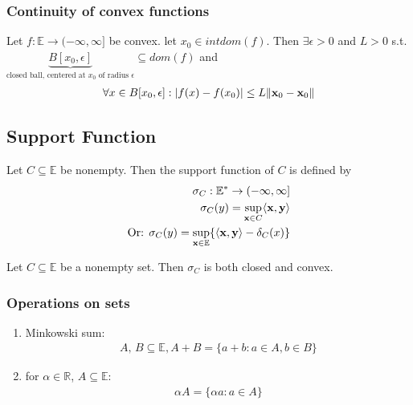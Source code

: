 \documentclass[11pt]{article}
\begin{document}
\subsubsection{Continuity of convex functions}
\begin{theorem}
    Let $f: \mathbb{E} \to (-\infty,\infty]$ be convex. let $x_0 \in intdom(f)$. Then
    $\exists \epsilon > 0$ and $L > 0$ s.t. 
    $\underbrace{B[x_0,\epsilon]}_{\text{closed ball, centered at }x_0 \text{ of radius }\epsilon}
    \subseteq dom(f)$ and 
    \begin{align*}
        \forall x \in B[x_0,\epsilon]: |f(x) - f(x_0)| \le L\| {\mathbf{x}}_0 - {\mathbf{x}}_{0} \| 
    \end{align*}
\end{theorem}

\subsection{Support Function}
\begin{definition}
    Let $C \subseteq \mathbb{E}$ be nonempty. Then the support function of $C$ is defined by
    \begin{align*}
        \sigma_{C}: \mathbb{E}^{*} \to (-\infty,\infty]\\
        \sigma_{C}(y) = \sup_{{\mathbf{x}} \in C} \langle {\mathbf{x}},{\mathbf{y}} \rangle \\
        \text{Or: } \sigma_{C}(y) = \sup_{{\mathbf{x}} \in \mathbb{E}}\{ \langle {\mathbf{x}},{\mathbf{y}} \rangle 
        - \delta_{C}(x)\}
    \end{align*}
\end{definition}

\begin{lemma}
    Let $C \subseteq \mathbb{E}$ be a nonempty set. Then $\sigma_{C}$ is both closed and convex.
\end{lemma}

\subsubsection{Operations on sets}
\begin{enumerate}
    \item Minkowski sum:
    \begin{align*}
        A, \,B \subseteq \mathbb{E}, A+B = \{ a+b: a\in A, b\in B \}
    \end{align*}
    \item for $\alpha \in \mathbb{R}$, $A \subseteq \mathbb{E}$:
    \begin{align*}
        \alpha A = \{ \alpha a: a\in A \}
    \end{align*}
\end{enumerate}
\end{document}
